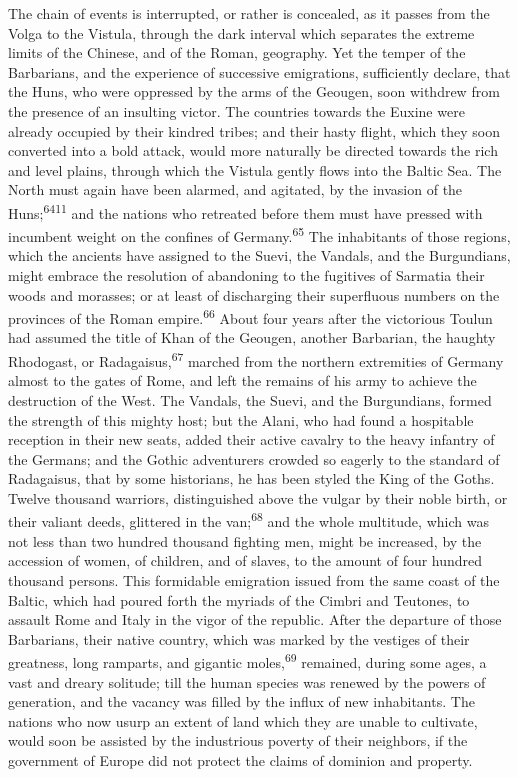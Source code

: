 
The chain of events is interrupted, or rather is concealed, as it
passes from the Volga to the Vistula, through the dark interval
which separates the extreme limits of the Chinese, and of the
Roman, geography. Yet the temper of the Barbarians, and the
experience of successive emigrations, sufficiently declare, that
the Huns, who were oppressed by the arms of the Geougen, soon
withdrew from the presence of an insulting victor. The countries
towards the Euxine were already occupied by their kindred tribes;
and their hasty flight, which they soon converted into a bold
attack, would more naturally be directed towards the rich and
level plains, through which the Vistula gently flows into the
Baltic Sea. The North must again have been alarmed, and agitated,
by the invasion of the Huns;\textsuperscript{6411} and the nations who retreated
before them must have pressed with incumbent weight on the
confines of Germany.\textsuperscript{65} The inhabitants of those regions, which
the ancients have assigned to the Suevi, the Vandals, and the
Burgundians, might embrace the resolution of abandoning to the
fugitives of Sarmatia their woods and morasses; or at least of
discharging their superfluous numbers on the provinces of the
Roman empire.\textsuperscript{66} About four years after the victorious Toulun had
assumed the title of Khan of the Geougen, another Barbarian, the
haughty Rhodogast, or Radagaisus,\textsuperscript{67} marched from the northern
extremities of Germany almost to the gates of Rome, and left the
remains of his army to achieve the destruction of the West. The
Vandals, the Suevi, and the Burgundians, formed the strength of
this mighty host; but the Alani, who had found a hospitable
reception in their new seats, added their active cavalry to the
heavy infantry of the Germans; and the Gothic adventurers crowded
so eagerly to the standard of Radagaisus, that by some
historians, he has been styled the King of the Goths. Twelve
thousand warriors, distinguished above the vulgar by their noble
birth, or their valiant deeds, glittered in the van;\textsuperscript{68} and the
whole multitude, which was not less than two hundred thousand
fighting men, might be increased, by the accession of women, of
children, and of slaves, to the amount of four hundred thousand
persons. This formidable emigration issued from the same coast of
the Baltic, which had poured forth the myriads of the Cimbri and
Teutones, to assault Rome and Italy in the vigor of the republic.
After the departure of those Barbarians, their native country,
which was marked by the vestiges of their greatness, long
ramparts, and gigantic moles,\textsuperscript{69} remained, during some ages, a
vast and dreary solitude; till the human species was renewed by
the powers of generation, and the vacancy was filled by the
influx of new inhabitants. The nations who now usurp an extent of
land which they are unable to cultivate, would soon be assisted
by the industrious poverty of their neighbors, if the government
of Europe did not protect the claims of dominion and property.


